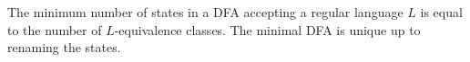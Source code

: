 

\setcounter{section}{4}
\setcounter{subsection}{3}
\setcounter{dfn}{7}

\begin{cor}
The minimum number of states in a DFA accepting a regular language $L$ is equal to the number of $L$-equivalence classes.
The minimal DFA is unique up to renaming the states.
\end{cor}


